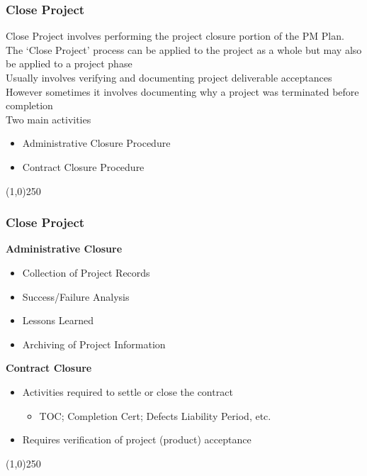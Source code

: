 \begin{frame}
\frametitle{Close Project}
Close Project involves performing the project closure portion of the PM Plan.\\
The `Close Project' process can be applied to the project as a whole but may also be applied to a project phase\\
Usually involves verifying and documenting project deliverable acceptances\\
However sometimes it involves documenting why a project was terminated before completion\\
Two main activities\\
\begin{itemize}
	\item Administrative Closure Procedure
	\item Contract Closure Procedure
\end{itemize}
\end{frame}\begin{center}\line(1,0){250}\end{center}
%
%

\begin{frame}
\frametitle{Close Project}
\textbf{Administrative Closure}
\begin{itemize}
	\item Collection of Project Records
	\item Success/Failure Analysis
	\item Lessons Learned
	\item Archiving of Project Information
\end{itemize}
\textbf{Contract Closure}
\begin{itemize}
	\item Activities required to settle or close the contract
		\begin{itemize}
			\item TOC; Completion Cert; Defects Liability Period, etc.
		\end{itemize}
	\item Requires verification of project (product) acceptance
\end{itemize}
\end{frame}\begin{center}\line(1,0){250}\end{center}
%








